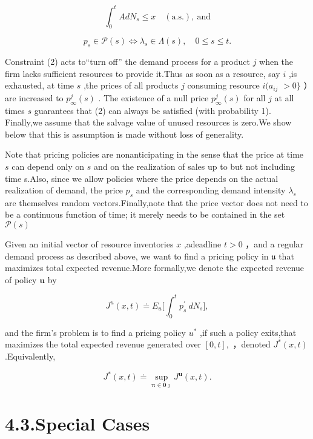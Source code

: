 \[
\int _ { 0 } ^ { t } A d N _ { s } \leqslant x \quad \mathrm { ( a . s . ) , ~ a n d }
\]

\[
p _ { s } \in \mathcal { P } ( s ) \Leftrightarrow \lambda _ { s } \in \Lambda ( s ) , \quad 0 \leqslant s \leqslant t .
\]

Constraint (2) acts to``turn off'' the demand process for a product
\(j\) when the firm lacks sufficient resources to provide it.Thus as
soon as a resource, say \(i\) ,is exhausted, at time \(s\) ,the prices
of all products \(j\) consuming resource \(i ( a _ { i j }\) \(> 0 \}\)
）are increased to \(p _ { \infty } ^ { j } ( s )\) . The existence of a
null price \(p _ { \infty } ^ { j } ( s )\) for all \(j\) at all times
\(s\) guarantees that (2) can always be satisfied (with probability 1).
Finally,we assume that the salvage value of unused resources is zero.We
show below that this is assumption is made without loss of generality.

Note that pricing policies are nonanticipating in the sense that the
price at time \(s\) can depend only on \(s\) and on the realization of
sales up to but not including time s.Also, since we allow policies where
the price depends on the actual realization of demand, the price
\(p _ { s }\) and the corresponding demand intensity \(\lambda _ { s }\)
are themselves random vectors.Finally,note that the price vector does
not need to be a continuous function of time; it merely needs to be
contained in the set \(\mathcal { P } ( s )\)

Given an initial vector of resource inventories \(x\) ,adeadline
\(t > 0\) ，and a regular demand process as described above, we want to find a pricing policy in \(\mathfrak { u }\) that maximizes total expected revenue.More formally,we denote the expected revenue of policy
\(\boldsymbol { u }\) by

\[
J ^ { u } ( x , t ) \doteq E _ { u } \biggl [ \int _ { 0 } ^ { t } p _ { s } ^ { \prime } \ d N _ { s } \biggl ] ,
\]

and the firm's problem is to find a pricing policy \(u ^ { * }\) ,if
such a policy exits,that maximizes the total expected revenue generated
over \([ 0 , t ] ,\) ，denoted \(J ^ { * } ( x , t )\) .Equivalently,

\[
J ^ { * } ( x , t ) \doteq \operatorname* { s u p } _ { \boldsymbol { \pi } \in \boldsymbol { 0 } \boldsymbol { \jmath } } J ^ { \boldsymbol { u } } ( x , t ) .
\]

\section{4.3.Special Cases}\label{special-cases}

